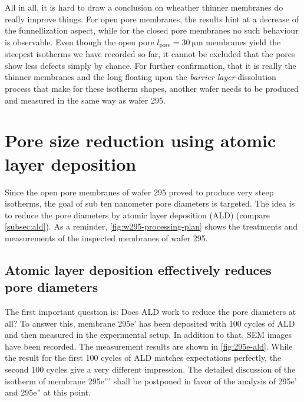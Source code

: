 \documentclass[../thesis.tex]{subfiles}
\begin{document}
    All in all, it is hard to draw a conclusion on wheather thinner membranes do really improve things. For open pore membranes, the results hint at a decrease of the funnellization aspect, while for the closed pore membranes no such behaviour is observable. Even though the open pore $l_\mathrm{pore}=\SI{30}{\micro\meter}$ membranes yield the steepest isotherms we have recorded so far, it cannot be excluded that the pores show less defects simply by chance. For further confirmation, that it is really the thinner membranes and the long floating upon the \textit{barrier layer} dissolution process that make for these isotherm shapes, another wafer needs to be produced and measured in the same way as wafer 295.


  \section{Pore size reduction using atomic layer deposition}
  \label{sec:ald-experiments}

    Since the open pore membranes of wafer 295 proved to produce very steep isotherms, the goal of sub ten nanometer pore diameters is targeted. The idea is to reduce the pore diameters by atomic layer deposition (ALD) (compare \cref{subsec:ald}). As a reminder, \cref{fig:w295-processing-plan} shows the treatments and measurements of the inspected membranes of wafer 295.

    


    \subsection{Atomic layer deposition effectively reduces pore diameters}
    \label{subsec:ald-reduces-diameters}

      The first important question is: Does ALD work to reduce the pore diameters at all? To answer this, membrane 295e' has been deposited with 100 cycles of ALD and then measured in the experimental setup. In addition to that, SEM images have been recorded. The measurement results are shown in \cref{fig:295e-ald}. While the result for the first 100 cycles of ALD matches expectations perfectly, the second 100 cycles give a very different impression. The detailed discussion of the isotherm of membrane 295e''' shall be postponed in favor of the analysis of 295e' and 295e'' at this point.
\end{document}
